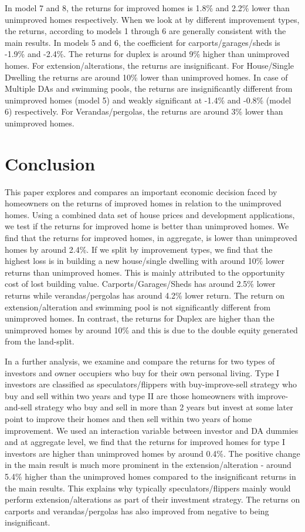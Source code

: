 \documentclass[AEJ,reqno, draftmode]{AEA} %
\begin{document}
In model 7 and 8, the returns for improved homes is 1.8\% and 2.2\% lower than unimproved homes respectively. When we look at by different improvement types, the returns, according to models 1 through 6 are generally consistent with the main results. In models 5 and 6, the coefficient for carports/garages/sheds is -1.9\% and -2.4\%. The returns for duplex is around 9\% higher than unimproved homes. For extension/alterations, the returns are insignificant. For House/Single Dwelling the returns are around 10\% lower than unimproved homes. In case of Multiple DAs and swimming pools, the returns are insignificantly different from unimproved homes (model 5) and weakly significant at -1.4\% and -0.8\% (model 6) respectively. For Verandas/pergolas, the returns are around 3\% lower than unimproved homes.


\restoregeometry


\section{Conclusion}

This paper explores and compares an important economic decision faced by homeowners on the returns of improved homes in relation to the unimproved homes. Using a combined data set of house prices and development applications, we test if the returns for improved home is better than unimproved homes. We find that the returns for improved homes, in aggregate, is lower than unimproved homes by around 2.4\%. If we split by improvement types, we find that the highest loss is in building a new house/single dwelling with around 10\% lower returns than unimproved homes. This is mainly attributed to the opportunity cost of lost building value. Carports/Garages/Sheds has around 2.5\% lower returns while verandas/pergolas has around 4.2\% lower return. The return on extension/alteration and swimming pool is not significantly different from unimproved homes. In contrast, the returns for Duplex are higher than the unimproved homes by around 10\% and this is due to the double equity generated from the land-split.

In a further analysis, we examine and compare the returns for two types of investors and owner occupiers who buy for their own personal living. Type I investors are classified as speculators/flippers with buy-improve-sell strategy who buy and sell within two years and type II are those homeowners with improve-and-sell strategy who buy and sell in more than 2 years but invest at some later point to improve their homes and then sell within two years of home improvement. We used an interaction variable between investor and DA dummies and at aggregate level, we find that the returns for improved homes for type I investors are higher than unimproved homes by around 0.4\%. The positive change in the main result is much more prominent in the extension/alteration - around 5.4\% higher than the unimproved homes compared to the insignificant returns in the main results. This explains why typically speculators/flippers mainly would perform extension/alterations as part of their investment strategy. The returns on carports and verandas/pergolas has also improved from negative to being insignificant. 
\end{document}
